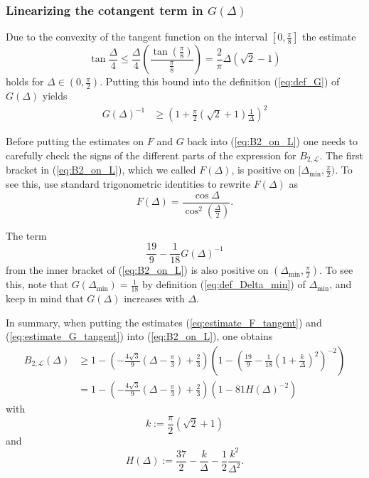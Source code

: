 \documentclass{article}
\begin{document}
\subsubsection*{Linearizing the cotangent term in $G(\Delta)$}
Due to the convexity of the tangent function on the interval $[0,\frac\pi 8]$ the estimate
\[\tan\frac\Delta 4 \le \frac\Delta 4 \left(\frac{\tan(\frac\pi 8)}{\frac\pi 8}\right) = \frac 2\pi \Delta (\sqrt 2 - 1)\]
holds for $\Delta\in(0,\frac\pi 2)$. Putting this bound into the definition (\ref{eq:def_G}) of $G(\Delta)$ yields
\begin{align} \label{eq:estimate_G_tangent}
    G(\Delta)^{-1} 
    &\ge \left(1 + \frac\pi 2(\sqrt 2+1)\frac 1 \Delta\right)^2
\end{align}

Before putting the estimates on $F$ and $G$ back into (\ref{eq:B2_on_L}) one needs to carefully check the signs of the different parts of the expression for $B_{2,\mathcal{L}}$. The first bracket in (\ref{eq:B2_on_L}), which we called $F(\Delta)$, is positive on $[\Delta_{\text{min}},\frac\pi 2)$. To see this, use standard trigonometric identities to rewrite $F(\Delta)$ as
\[F(\Delta) = \frac{\cos\Delta}{\cos^2(\frac \Delta2)}.\]

The term 
\[\frac{19}{9}-\frac{1}{18}G(\Delta)^{-1}\]
from the inner bracket of (\ref{eq:B2_on_L}) is also positive on $(\Delta_{\text{min}},\frac\pi 2)$. To see this, note that $G(\Delta_{\text{min}}) = \frac{1}{18}$ by definition (\ref{eq:def_Delta_min}) of $\Delta_{\text{min}}$, and keep in mind that $G(\Delta)$ increases with $\Delta$. 

In summary, when putting the estimates (\ref{eq:estimate_F_tangent}) and (\ref{eq:estimate_G_tangent}) into (\ref{eq:B2_on_L}), one obtains
\begin{align}
    B_{2,\mathcal{L}}(\Delta) &\ge 1 - \left(-\frac{4\sqrt 3}{9}(\Delta-\frac \pi 3) + \frac 23\right)\left( 1-\left(\frac{19}{9} - \frac{1}{18} \left(1+\frac k\Delta\right)^{2}\right)^{-2}\right)\nonumber\\
    &= 1 - \left(-\frac{4\sqrt 3}{9}(\Delta-\frac \pi 3) + \frac 23\right)\left( 1-81H(\Delta)^{-2}\right) \label{eq:B2_on_L2}
\end{align}
with
\[k := \frac\pi 2(\sqrt 2 +1)\]
and
\[H(\Delta) := \frac{37}2 - \frac k\Delta - \frac 12 \frac{k^2}{\Delta^2}.\]
\end{document}
